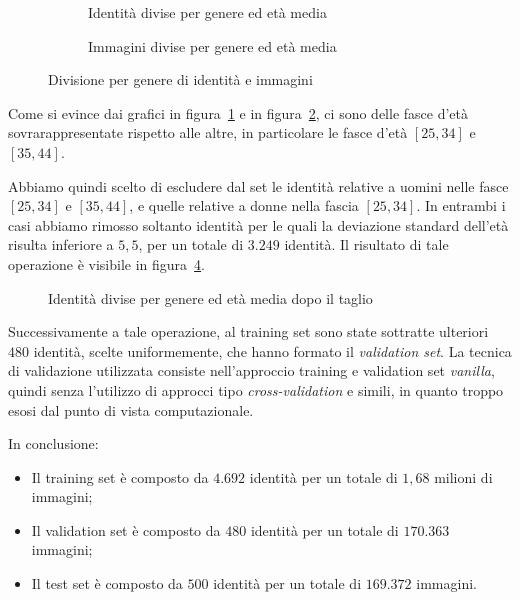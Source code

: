 \begin{figure}[ht]

\begin{subfigure}{0.5\textwidth}
\def\svgscale{0.42}

\caption{Identità divise per genere ed età media}
\label{sfig:Ids per gender and mean age}
\end{subfigure}
\begin{subfigure}{0.5\textwidth}
\def\svgscale{0.42}

\caption{Immagini divise per genere ed età media}
\label{sfig:Images per gender and mean age}
\end{subfigure}
\caption{Divisione per genere di identità e immagini}
\label{fig:gender_age_division}
\end{figure}

Come si evince dai grafici in figura~\ref{sfig:Ids per gender and mean age} e in figura~\ref{sfig:Images per gender and mean age}, ci sono delle fasce d'età sovrarappresentate rispetto alle altre, in particolare le fasce d'età $[25,34]$ e $[35,44]$.

Abbiamo quindi scelto di escludere dal set le identità relative a uomini nelle fasce $[25,34]$ e $[35,44]$, e quelle relative a donne nella fascia $[25,34]$. In entrambi i casi abbiamo rimosso soltanto identità per le quali la deviazione standard dell'età risulta inferiore a $5,5$, per un totale di $3.249$ identità. Il risultato di tale operazione è visibile in figura~\ref{fig:Ids per gender and mean age after the drop}.

\begin{figure}[ht]
\centering
\def\svgscale{0.7}

\caption{Identità divise per genere ed età media dopo il taglio}
\label{fig:Ids per gender and mean age after the drop}
\end{figure}

Successivamente a tale operazione, al training set sono state sottratte ulteriori $480$ identità, scelte uniformemente, che hanno formato il \emph{validation set}. La tecnica di validazione utilizzata consiste nell'approccio training e validation set \emph{vanilla}, quindi senza l'utilizzo di approcci tipo \emph{cross-validation} e simili, in quanto troppo esosi dal punto di vista computazionale.

In conclusione:
\begin{itemize}
	\item Il training set è composto da $4.692$ identità per un totale di $1,68$ milioni di immagini;
	\item Il validation set è composto da $480$ identità per un totale di $170.363$ immagini;
	\item Il test set è composto da $500$ identità per un totale di $169.372$ immagini.
\end{itemize}
